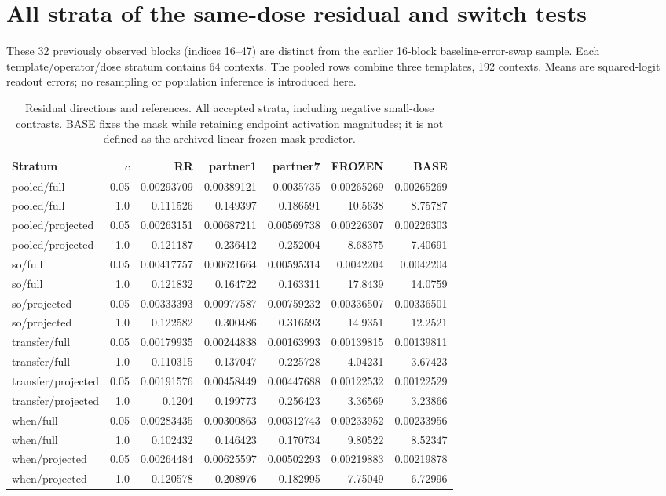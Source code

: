 \section{All strata of the same-dose residual and switch tests}\label{app:samedose}
These 32 previously observed blocks (indices 16--47) are distinct from the earlier 16-block baseline-error-swap sample. Each template/operator/dose stratum contains 64 contexts. The pooled rows combine three templates, 192 contexts. Means are squared-logit readout errors; no resampling or population inference is introduced here.
\begin{table}[!ht]\centering\scriptsize
\setlength{\tabcolsep}{3pt}
\begin{tabular}{lrrrrrr}\toprule
Stratum & $c$ & RR & partner1 & partner7 & FROZEN & BASE\\\midrule
pooled/full & 0.05 & 0.00293709 & 0.00389121 & 0.0035735 & 0.00265269 & 0.00265269\\
pooled/full & 1.0 & 0.111526 & 0.149397 & 0.186591 & 10.5638 & 8.75787\\
pooled/projected & 0.05 & 0.00263151 & 0.00687211 & 0.00569738 & 0.00226307 & 0.00226303\\
pooled/projected & 1.0 & 0.121187 & 0.236412 & 0.252004 & 8.68375 & 7.40691\\
so/full & 0.05 & 0.00417757 & 0.00621664 & 0.00595314 & 0.0042204 & 0.0042204\\
so/full & 1.0 & 0.121832 & 0.164722 & 0.163311 & 17.8439 & 14.0759\\
so/projected & 0.05 & 0.00333393 & 0.00977587 & 0.00759232 & 0.00336507 & 0.00336501\\
so/projected & 1.0 & 0.122582 & 0.300486 & 0.316593 & 14.9351 & 12.2521\\
transfer/full & 0.05 & 0.00179935 & 0.00244838 & 0.00163993 & 0.00139815 & 0.00139811\\
transfer/full & 1.0 & 0.110315 & 0.137047 & 0.225728 & 4.04231 & 3.67423\\
transfer/projected & 0.05 & 0.00191576 & 0.00458449 & 0.00447688 & 0.00122532 & 0.00122529\\
transfer/projected & 1.0 & 0.1204 & 0.199773 & 0.256423 & 3.36569 & 3.23866\\
when/full & 0.05 & 0.00283435 & 0.00300863 & 0.00312743 & 0.00233952 & 0.00233956\\
when/full & 1.0 & 0.102432 & 0.146423 & 0.170734 & 9.80522 & 8.52347\\
when/projected & 0.05 & 0.00264484 & 0.00625597 & 0.00502293 & 0.00219883 & 0.00219878\\
when/projected & 1.0 & 0.120578 & 0.208976 & 0.182995 & 7.75049 & 6.72996\\
\bottomrule\end{tabular}
\caption{Residual directions and references. All accepted strata, including negative small-dose contrasts. BASE fixes the mask while retaining endpoint activation magnitudes; it is not defined as the archived linear frozen-mask predictor.}\end{table}
